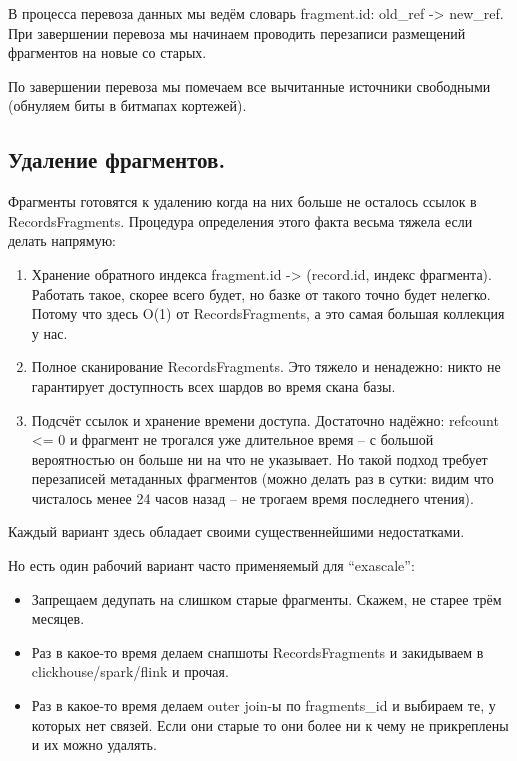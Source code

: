 В процесса перевоза данных мы ведём словарь fragment.id: old\_ref
-\textgreater{} new\_ref. При завершении перевоза мы начинаем проводить
перезаписи размещений фрагментов на новые со старых.

По завершении перевоза мы помечаем все вычитанные источники свободными
(обнуляем биты в битмапах кортежей).

\subsection{Удаление
фрагментов.}\label{ux443ux434ux430ux43bux435ux43dux438ux435-ux444ux440ux430ux433ux43cux435ux43dux442ux43eux432.}

Фрагменты готовятся к удалению когда на них больше не осталось ссылок в
RecordsFragments. Процедура определения этого факта весьма тяжела если
делать напрямую:

\begin{enumerate}
\def\labelenumi{\arabic{enumi}.}
\tightlist
\item
  Хранение обратного индекса fragment.id -\textgreater{} (record.id,
  индекс фрагмента). Работать такое, скорее всего будет, но базке от
  такого точно будет нелегко. Потому что здесь O(1) от RecordsFragments,
  а это самая большая коллекция у нас.
\item
  Полное сканирование RecordsFragments. Это тяжело и ненадежно: никто не
  гарантирует доступность всех шардов во время скана базы.
\item
  Подсчёт ссылок и хранение времени доступа. Достаточно надёжно:
  refcount \textless= 0 и фрагмент не трогался уже длительное время -- с
  большой вероятностью он больше ни на что не указывает. Но такой подход
  требует перезаписей метаданных фрагментов (можно делать раз в сутки:
  видим что чисталось менее 24 часов назад -- не трогаем время
  последнего чтения).
\end{enumerate}

Каждый вариант здесь обладает своими существеннейшими недостатками.

Но есть один рабочий вариант часто применяемый для ``exascale'':

\begin{itemize}
\tightlist
\item
  Запрещаем дедупать на слишком старые фрагменты. Скажем, не старее трём
  месяцев.
\item
  Раз в какое-то время делаем снапшоты RecordsFragments и закидываем в
  clickhouse/spark/flink и прочая.
\item
  Раз в какое-то время делаем outer join-ы по fragments\_id и выбираем
  те, у которых нет связей. Если они старые то они более ни к чему не
  прикреплены и их можно удалять.
\end{itemize}
